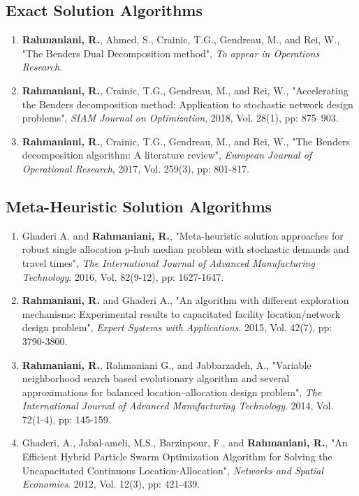 \documentclass[10PT,letter]{article}
\newcommand{\subsectionstyle}[1]{\normalfont\selectfont\textcolor{titlecol}{\sffamily #1}}
\begin{document}
        \subsection*{\subsectionstyle{Exact  Solution Algorithms}}
	        \begin{enumerate}[itemsep=.5mm]
					\item 
								\textbf{Rahmaniani, R.}, Ahmed, S., Crainic, T.G., Gendreau, M., and Rei, W., "The Benders Dual Decomposition method", \textit{To appear in Operations Research}.
					\item 
								\textbf{Rahmaniani, R.}, Crainic, T.G., Gendreau, M., and Rei, W., "Accelerating the Benders decomposition method: Application to stochastic network design problems", \textit{SIAM Journal on Optimization}, 2018, Vol. 28(1), pp: 875–903.
					\item
								 \textbf{Rahmaniani, R.}, Crainic, T.G., Gendreau, M., and Rei, W., "The Benders decomposition algorithm: A literature review", \textit{European Journal of Operational Research}, 2017, Vol. 259(3), pp: 801-817.
			\end{enumerate}
		\subsection*{\subsectionstyle{Meta-Heuristic  Solution Algorithms}}
			\begin{enumerate}[itemsep=.5mm]
				\item 
							Ghaderi A. and \textbf{Rahmaniani, R.}, "Meta-heuristic solution approaches for robust single allocation p-hub median problem with stochastic demands and travel times", \textit{The International Journal of Advanced Manufacturing Technology}. 2016, Vol. 82(9-12), pp: 1627-1647.
				\item 
							\textbf{Rahmaniani, R.} and Ghaderi A., "An algorithm with different exploration mechanisms: Experimental results to capacitated facility location/network design problem", \textit{Expert Systems with Applications}. 2015, Vol. 42(7), pp: 3790-3800.
				\item
							 \textbf{Rahmaniani, R.}, Rahmaniani G., and Jabbarzadeh, A., "Variable neighborhood search based evolutionary algorithm and several approximations for balanced location–allocation design problem", \textit{The International Journal of Advanced Manufacturing Technology}. 2014, Vol. 72(1-4), pp: 145-159.
				\item 
							Ghaderi, A., Jabal-ameli, M.S., Barzinpour, F., and \textbf{Rahmaniani, R.}, "An Efficient Hybrid Particle Swarm Optimization Algorithm for Solving the Uncapacitated Continuous Location-Allocation", \textit{Networks and Spatial Economics}. 2012, Vol. 12(3), pp: 421-439.
			\end{enumerate}
\end{document}
